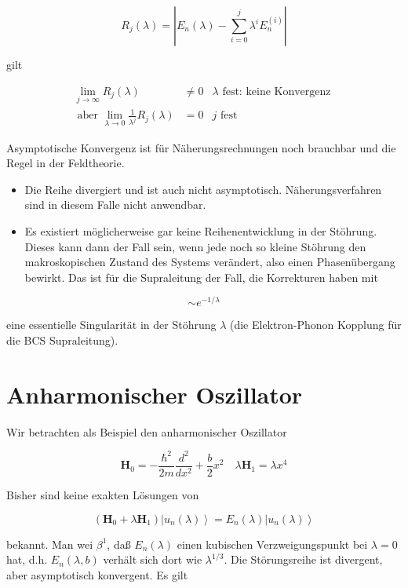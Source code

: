\documentclass[10pt, letterpaper]{article}
\begin{document}
$$
R_{j}(\lambda)=\left|E_{n}(\lambda)-\sum_{i=0}^{j} \lambda^{i} E_{n}^{(i)}\right|
$$

gilt

$$
\begin{array}{rlrl}
\lim _{j \rightarrow \infty} R_{j}(\lambda) & \neq 0 & \lambda \text { fest: keine Konvergenz } \\
\text { aber } \lim _{\lambda \rightarrow 0} \frac{1}{\lambda^{j}} R_{j}(\lambda) & =0 & j \text { fest }
\end{array}
$$

Asymptotische Konvergenz ist für Näherungsrechnungen noch brauchbar und die Regel in der Feldtheorie.

\begin{itemize}
  \item Die Reihe divergiert und ist auch nicht asymptotisch. Näherungsverfahren sind in diesem Falle nicht anwendbar.
  \item Es existiert möglicherweise gar keine Reihenentwicklung in der Stöhrung. Dieses kann dann der Fall sein, wenn jede noch so kleine Stöhrung den makroskopischen Zustand des Systems verändert, also einen Phasenübergang bewirkt. Das ist für die Supraleitung der Fall, die Korrekturen haben mit
\end{itemize}

$$
\sim e^{-1 / \lambda}
$$

eine essentielle Singularität in der Stöhrung $\lambda$ (die Elektron-Phonon Kopplung für die BCS Supraleitung).

\section*{Anharmonischer Oszillator}
Wir betrachten als Beispiel den anharmonischer Oszillator

$$
\mathbf{H}_{0}=-\frac{\hbar^{2}}{2 m} \frac{d^{2}}{d x^{2}}+\frac{b}{2} x^{2} \quad \lambda \mathbf{H}_{1}=\lambda x^{4}
$$

Bisher sind keine exakten Lösungen von

$$
\left(\mathbf{H}_{0}+\lambda \mathbf{H}_{1}\right)\left|u_{n}(\lambda)\right\rangle=E_{n}(\lambda)\left|u_{n}(\lambda)\right\rangle
$$

bekannt. Man wei $\beta^{1}$, daß $E_{n}(\lambda)$ einen kubischen Verzweigungspunkt bei $\lambda=0$ hat, d.h. $E_{n}(\lambda, b)$ verhält sich dort wie $\lambda^{1 / 3}$. Die Störungsreihe ist divergent, aber asymptotisch konvergent. Es gilt
\end{document}
